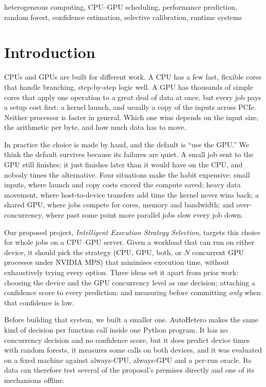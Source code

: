 \documentclass[conference]{IEEEtran}
\begin{document}
\begin{IEEEkeywords}
heterogeneous computing, CPU--GPU scheduling, performance prediction, random forest, confidence estimation, selective calibration, runtime systems
\end{IEEEkeywords}

\section{Introduction}

CPUs and GPUs are built for different work. A CPU has a few fast, flexible cores that handle branching, step-by-step logic well. A GPU has thousands of simple cores that apply one operation to a great deal of data at once, but every job pays a setup cost first: a kernel launch, and usually a copy of the inputs across PCIe. Neither processor is faster in general. Which one wins depends on the input size, the arithmetic per byte, and how much data has to move.

In practice the choice is made by hand, and the default is ``use the GPU.'' We think the default survives because its failures are quiet. A small job sent to the GPU still finishes; it just finishes later than it would have on the CPU, and nobody times the alternative. Four situations make the habit expensive: small inputs, where launch and copy costs exceed the compute saved; heavy data movement, where host-to-device transfers add time the kernel never wins back; a shared GPU, where jobs compete for cores, memory and bandwidth; and over-concurrency, where past some point more parallel jobs slow every job down.

Our proposed project, \emph{Intelligent Execution Strategy Selection}, targets this choice for whole jobs on a CPU--GPU server. Given a workload that can run on either device, it should pick the strategy (CPU, GPU, both, or $N$ concurrent GPU processes under NVIDIA MPS) that minimises execution time, without exhaustively trying every option. Three ideas set it apart from prior work: choosing the device and the GPU concurrency level as one decision; attaching a confidence score to every prediction; and measuring before committing \emph{only} when that confidence is low.

Before building that system, we built a smaller one. AutoHetero makes the same kind of decision per function call inside one Python program. It has no concurrency decision and no confidence score, but it does predict device times with random forests, it measures some calls on both devices, and it was evaluated on a fixed machine against always-CPU, always-GPU and a per-run oracle. Its data can therefore test several of the proposal's premises directly and one of its mechanisms offline.
\end{document}
